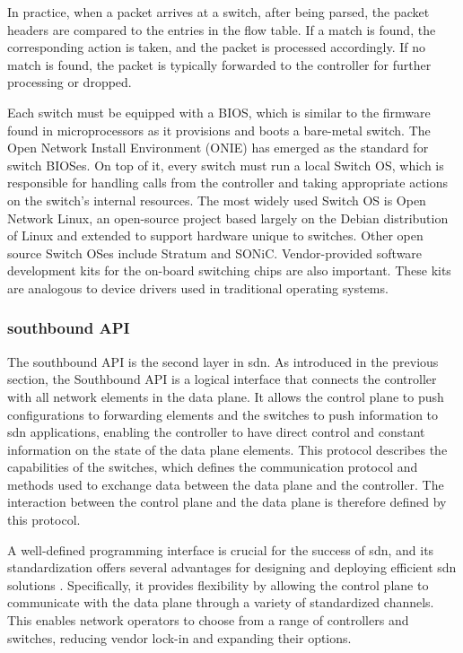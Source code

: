 In practice, when a packet arrives at a switch, after being parsed, the packet headers are compared to the entries in the flow table. If a match is found, the corresponding action is taken, and the packet is processed accordingly. If no match is found, the packet is typically forwarded to the controller for further processing or dropped.

Each switch must be equipped with a BIOS, which is similar to the firmware found in microprocessors as it provisions and boots a bare-metal switch. The Open Network Install Environment (ONIE) has emerged as the standard for switch BIOSes\cite{peterson_software-defined_2021}. On top of it, every switch must run a local Switch OS, which is responsible for handling calls from the controller and taking appropriate actions on the switch's internal resources. The most widely used Switch OS is Open Network Linux, an open-source project based largely on the Debian distribution of Linux and extended to support hardware unique to switches\cite{peterson_software-defined_2021}. Other open source Switch OSes include Stratum and SONiC. Vendor-provided software development kits for the on-board switching chips are also important. These kits are analogous to device drivers used in traditional operating systems. \cite{peterson_software-defined_2021}


\subsubsection{southbound API} %

The southbound API is the second layer in \gls{sdn}. As introduced in the previous section, the Southbound API is a logical interface that connects the controller with all network elements in the data plane\cite{thyagaturu_software_2016}. It allows the control plane to push configurations to forwarding elements and the switches to push information to \gls{sdn} applications, enabling the controller to have direct control and constant information on the state of the data plane elements. 
This protocol describes the capabilities of the switches, which defines the communication protocol and methods used to exchange data between the data plane and the controller. The interaction between the control plane and the data plane is therefore defined by this protocol\cite{kreutz_software-defined_2015}. 

A well-defined programming interface is crucial for the success of \gls{sdn}, and its standardization offers several advantages for designing and deploying efficient \gls{sdn} solutions\cite{latif_comprehensive_2020} \cite{kreutz_software-defined_2015}. Specifically, it provides flexibility by allowing the control plane to communicate with the data plane through a variety of standardized channels. This enables network operators to choose from a range of controllers and switches, reducing vendor lock-in and expanding their options.

